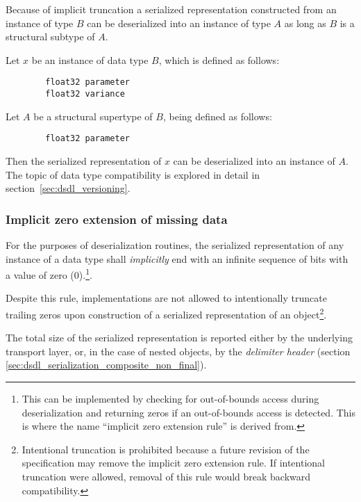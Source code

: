 \begin{remark}
    Because of implicit truncation a serialized representation constructed from an instance of type $B$ can be
    deserialized into an instance of type $A$ as long as $B$ is a structural subtype of $A$.

    Let $x$ be an instance of data type $B$, which is defined as follows:

    \begin{verbatim}
        float32 parameter
        float32 variance
    \end{verbatim}

    Let $A$ be a structural supertype of $B$, being defined as follows:

    \begin{verbatim}
        float32 parameter
    \end{verbatim}

    Then the serialized representation of $x$ can be deserialized into an instance of $A$.
    The topic of data type compatibility is explored in detail in section~\ref{sec:dsdl_versioning}.
\end{remark}

\subsubsection{Implicit zero extension of missing data}\label{sec:dsdl_serialization_implicit_zero_extension}

For the purposes of deserialization routines,
the serialized representation of any instance of a data type shall \emph{implicitly} end with an
infinite sequence of bits with a value of zero (0).\footnote{%
    This can be implemented by checking for out-of-bounds access during deserialization and returning zeros
    if an out-of-bounds access is detected. This is where the name ``implicit zero extension rule'' is derived
    from.
}.

Despite this rule, implementations are not allowed to intentionally truncate trailing zeros
upon construction of a serialized representation of an object\footnote{%
    Intentional truncation is prohibited because a future revision of the specification may remove the implicit zero
    extension rule.
    If intentional truncation were allowed, removal of this rule would break backward compatibility.
}.

The total size of the serialized representation is reported either by the underlying transport layer, or,
in the case of nested objects, by the \emph{delimiter header}
(section \ref{sec:dsdl_serialization_composite_non_final}).

